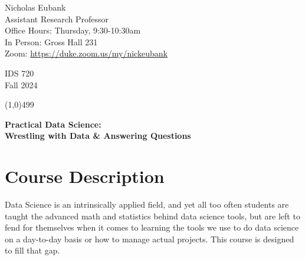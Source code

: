 \documentclass[12pt]{article}
\begin{document}
\singlespacing






\thispagestyle{empty}
\begin{minipage}[t]{.5\textwidth}
	Nicholas Eubank \\
	 Assistant Research Professor\\
	 Office Hours: Thursday, 9:30-10:30am \\
	 In Person: Gross Hall 231 \\
	 Zoom: \href{https://duke.zoom.us/my/nickeubank}{https://duke.zoom.us/my/nickeubank}
     \vspace*{0.1cm}
\end{minipage}
\begin{minipage}[t]{.5\textwidth}
	\begin{flushright}  IDS 720\\
	Fall 2024
    \vspace*{0.1cm}
\end{flushright}
\end{minipage}


\line(1,0){499}

\vspace{.35in}

\begin{center}
	\textbf{\LARGE{Practical Data Science:} }\\
	\vspace*{.05in}
	\textbf{\large{Wrestling with Data \& Answering Questions}}
\end{center}








\section{Course Description}


Data Science is an intrinsically applied field, and yet all too often students are taught the advanced math and statistics behind data science tools, but are left to fend for themselves when it comes to learning the tools we use to do data science on a day-to-day basis or how to manage actual projects. This course is designed to fill that gap.
\end{document}
